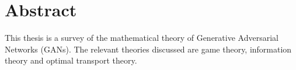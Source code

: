 \section{Abstract}

\begin{center}
  \begin{minipage}[center]{0.7\linewidth}
    This thesis is a survey of the mathematical theory of Generative Adversarial
    Networks (GANs). The relevant theories discussed are game theory,
    information theory and optimal transport theory.
  \end{minipage}
\end{center}

